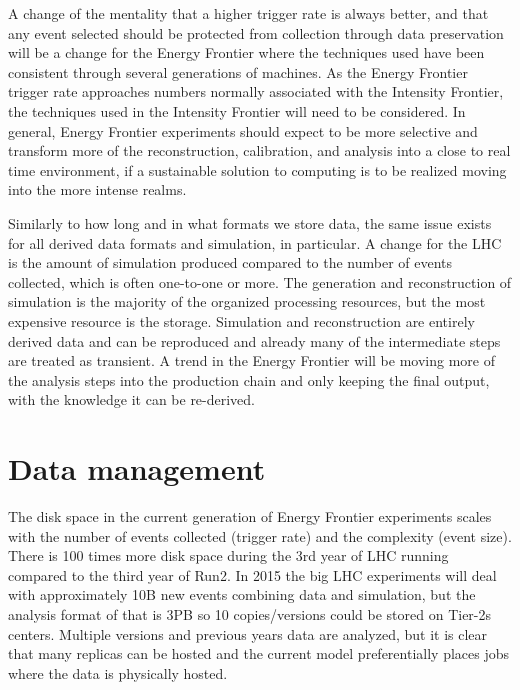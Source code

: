 A change of the mentality that a higher trigger rate is always better,
and that any event selected should be protected from collection
through data preservation will be a change for the Energy Frontier
where the techniques used have been consistent through several
generations of machines.  As the Energy Frontier trigger rate
approaches numbers normally associated with the Intensity Frontier, the
techniques used in the Intensity Frontier will need to be considered.
In general, Energy Frontier experiments should expect to be more
selective and transform more of the reconstruction, calibration, and
analysis into a close to real time environment, if a sustainable
solution to computing is to be realized moving into the more intense
realms.

Similarly to how long and in what formats we store data, the same
issue exists for all derived data formats and simulation, in
particular.  A change for the LHC is the amount of simulation produced
compared to the number of events collected, which is often one-to-one
or more.  The generation and reconstruction of simulation is the
majority of the organized processing resources, but the most expensive
resource is the storage.  Simulation and reconstruction are entirely
derived data and can be reproduced and already many of the
intermediate steps are treated as transient.  A trend in the Energy
Frontier will be moving more of the analysis steps into the production
chain and only keeping the final output, with the knowledge it can be
re-derived.


\section{Data management}
\label{sec:comp-dm}


The disk space in the current generation of Energy Frontier
experiments scales with the number of events collected (trigger rate)
and the complexity (event size).  There is 100 times more disk space
during the 3rd year of LHC running compared to the third year of Run2.
In 2015 the big LHC experiments will deal with approximately 10B new
events combining data and simulation, but the analysis format of that
is 3PB so 10 copies/versions could be stored on Tier-2s centers.
Multiple versions and previous years data are analyzed, but it is
clear that many replicas can be hosted and the current model
preferentially places jobs where the data is physically hosted.

